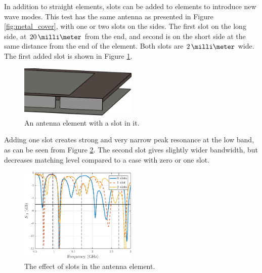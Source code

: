 In addition to straight elements, slots can be added to elements to introduce new wave modes. This test has the same antenna as presented in Figure \ref{fig:metal_cover}, with one or two slots on the sides. The first slot on the long side, at $20\,\milli\meter$ from the end, and second is on the short side at the same distance from the end of the element. Both slots are $2\,\milli\meter$ wide. The first added slot is shown in Figure \ref{fig:slot}.
\begin{figure}[H]
    \centering
    \includegraphics[width=0.5\textwidth]{img/slot.eps}
    \caption{An antenna element with a slot in it.}
    \label{fig:slot}
\end{figure}

Adding one slot creates strong and very narrow peak resonance at the low band, as can be seen from Figure \ref{fig:slot_res}. The second slot gives slightly wider bandwidth, but decreases matching level compared to a case with  zero or one slot.

\begin{figure}[H]
    \centering
    \includegraphics[width=0.5\textwidth]{img/slot_res.eps}
    \caption{The effect of slots in the antenna element.}
    \label{fig:slot_res}
\end{figure}

